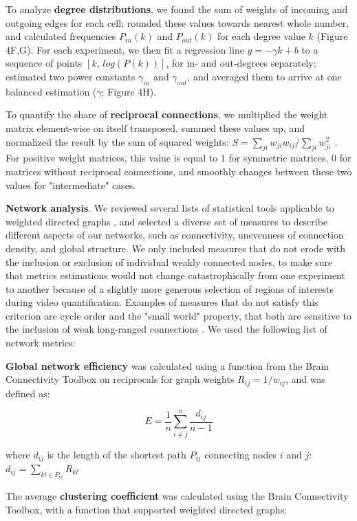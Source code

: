 \documentclass{article}
\begin{document}
To analyze \textbf{degree distributions}, we found the sum of weights of incoming and outgoing edges for each cell; rounded these values towards nearest whole number, and calculated frequencies $P_{in}(k)$ and $P_{out}(k)$ for each degree value $k$ (Figure 4F,G). For each experiment, we then fit a regression line $y = -\gamma k + b$ to a sequence of points $[k , \, log(P(k)) ]$, for in- and out-degrees separately; estimated two power constants $\gamma_{in}$ and $\gamma_{out}$, and averaged them to arrive at one balanced estimation ($\gamma$; Figure 4H).

To quantify the share of \textbf{reciprocal connections}, we multiplied the weight matrix element-wise on itself transposed, summed these values up, and normalized the result by the sum of squared weights: $S=\sum_{ji}{w_{ji} w_{ij}} / \sum_{ji}{w_{ji}^2}$ . For positive weight matrices, this value is equal to 1 for symmetric matrices, 0 for matrices without reciprocal connections, and smoothly changes between these two values for "intermediate" cases.

\textbf{Network analysis}. We reviewed several lists of statistical tools applicable to weighted directed graphs \citep{rubinov2010toolbox,costa2007networks,hernandez2011metrics}, and selected a diverse set of measures to describe  different aspects of our networks, such as connectivity, unevenness of connection density, and global structure. We only included measures that do not erode with the inclusion or exclusion of individual weakly connected nodes, to make sure that metrics estimations would not change catastrophically from one experiment to another because of a slightly more generous selection of regions of interests during video quantification. Examples of measures that do not satisfy this criterion are cycle order and the "small world" property, that both are sensitive to the inclusion of weak long-ranged connections \citep{papo2016beware}. We used the following list of network metrics:

\textbf{Global network efficiency} was calculated using a function from the Brain Connectivity Toolbox \citep{rubinov2010toolbox} on reciprocals for graph weights $R_{ij} = 1/w_{ij}$, and was defined as:

\[ E = \frac{1}{n} \sum_{i \neq j}^n{\frac{d_{ij}}{n-1}} \]

where $d_{ij}$ is the length of the shortest path $P_{ij}$ connecting nodes $i$ and $j$: $d_{ij} = \sum_{kl \in P_{ij}}{R_{kl}}$

The average \textbf{clustering coefficient} \citep{fagiolo2007} was calculated using the Brain Connectivity Toolbox, with a function that supported weighted directed graphs:
\end{document}
